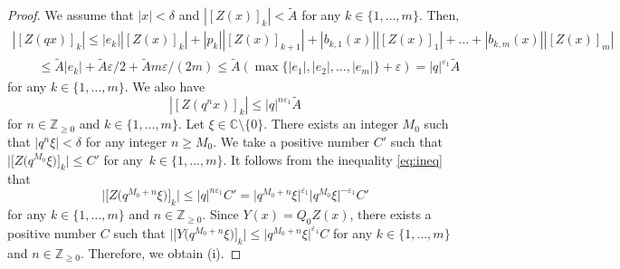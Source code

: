 \documentclass[10pt,a4paper]{amsart}
\begin{document}
\begin{proof}
We assume that $|x| < \delta $ and $|[Z(x )]_k| < \widetilde{A}$ for any $k \in \{1, \dots ,m \}$.
Then,
\begin{gather}
 | [Z(qx )]_k | \leq |e_k| | [Z(x )]_k| + |p_k | | [Z(x )]_{k+1}| + |b_{k,1}(x)| | [Z(x )]_1| + \dots + |b_{k,m}(x) | |[Z(x )]_m | \nonumber \\
\qquad \leq \widetilde{A} |e_k| + \widetilde{A} \varepsilon /2 + \widetilde{A} m \varepsilon /(2m) \leq \widetilde{A} ( \max \{ |e_1|, |e_2|, \dots , |e_m| \} + \varepsilon ) = |q|^{\varepsilon _1} \widetilde{A} \label{eq:Zqxineq}
\end{gather}
for any $k \in \{1, \dots ,m \}$.
We also have
\begin{equation}
 | [Z(q^n x )]_k | \leq |q|^{n \varepsilon _1} \widetilde{A} \label{eq:ineq}
\end{equation}
for $n \in \mathbb{Z} _{\geq 0} $ and $k \in \{1, \dots ,m \}$.
Let $\xi \in \mathbb{C} \setminus \{0\} $.
There exists an integer $M_0$ such that $| q^n \xi | < \delta $ for any integer $n \geq M_0$.
We take a positive number $C' $ such that $\big| \big[Z\bigl( q^{M_0} \xi \bigr)\big]_k\big| \leq C' $ for any~${k \in \{1, \dots ,m \}}$.
It follows from the inequality \eqref{eq:ineq} that
\[
\big| \big[Z\bigl( q^{M_0 +n} \xi \bigr)\big]_k\big| \leq |q|^{n \varepsilon _1 } C' = \big| q^{M_0 +n} \xi \big|^{\varepsilon _1} \big| q^{M_0 } \xi \big|^{-\varepsilon _1} C'
\]
for any $k \in \{1, \dots ,m \}$ and $n \in \mathbb{Z} _{\geq 0}$.
Since $Y (x) = Q_0 Z(x)$, there exists a positive number $C$ such that $\big| \big[Y\bigl( q^{M_0 +n} \xi \bigr)\big]_k\big| \leq \big|q^{M_0 +n} \xi\big|^{\varepsilon _1} C $ for any $k \in \{1, \dots ,m \}$ and $n \in \mathbb{Z} _{\geq 0}$.
Therefore, we obtain (i).


\end{proof}
\end{document}
